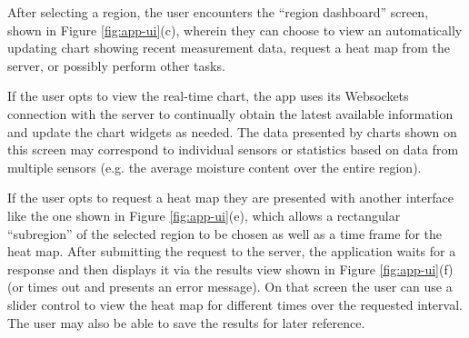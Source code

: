 \documentclass{article}
\begin{document}
After selecting a region, the user encounters the ``region dashboard'' screen,
shown in Figure \ref{fig:app-ui}(c), wherein they can choose to
view an automatically updating chart showing recent measurement data,
request a heat map from the server,
or possibly perform other tasks.

If the user opts to view the real-time chart, the app uses its Websockets connection
with the server to continually obtain the latest available information and update the
chart widgets as needed.
The data presented by charts shown on this screen may correspond to
individual sensors or statistics based on data from multiple sensors
(e.g. the average moisture content over the entire region).

If the user opts to request a heat map they are presented with another interface like
the one shown in Figure \ref{fig:app-ui}(e), which allows a rectangular ``subregion''
of the selected region to be chosen as well as a time frame for the heat map.
After submitting the request to the server, the application waits for a response
and then displays it via the results view shown in Figure \ref{fig:app-ui}(f)
(or times out and presents an error message).
On that screen the user can use a slider control to view the heat map for different
times over the requested interval.
The user may also be able to save the results for later reference.
\end{document}
